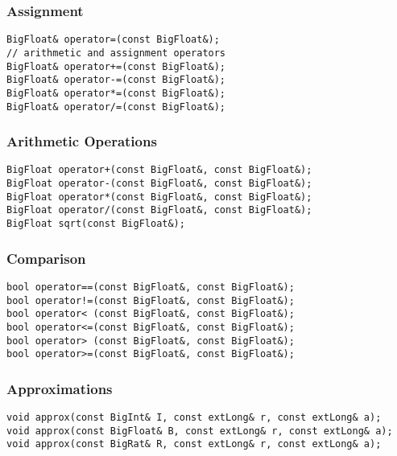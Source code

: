 \subsubsection{Assignment}

\begin{progb} {
\> \tt	BigFloat\& operator=(const BigFloat\&);\\
\> // arithmetic and assignment operators\\
\> \tt	BigFloat\& operator+=(const BigFloat\&);\\
\> \tt	BigFloat\& operator-=(const BigFloat\&);\\
\> \tt	BigFloat\& operator*=(const BigFloat\&);\\
\> \tt	BigFloat\& operator/=(const BigFloat\&);
}\end{progb}

\subsubsection{Arithmetic Operations}
\begin{progb} {
\> \tt	BigFloat operator+(const BigFloat\&, const BigFloat\&); \\
\> \tt	BigFloat operator-(const BigFloat\&, const BigFloat\&); \\
\> \tt	BigFloat operator*(const BigFloat\&, const BigFloat\&); \\
\> \tt	BigFloat operator/(const BigFloat\&, const BigFloat\&); \\
\> \tt	BigFloat sqrt(const BigFloat\&);
}\end{progb}

\subsubsection{Comparison}
\begin{progb} {
\> \tt	bool operator==(const BigFloat\&, const BigFloat\&); \\
\> \tt	bool operator!=(const BigFloat\&, const BigFloat\&); \\
\> \tt	bool operator< (const BigFloat\&, const BigFloat\&); \\
\> \tt	bool operator<=(const BigFloat\&, const BigFloat\&); \\
\> \tt	bool operator> (const BigFloat\&, const BigFloat\&); \\
\> \tt	bool operator>=(const BigFloat\&, const BigFloat\&);
}\end{progb}

\subsubsection{Approximations}
\label{sec-bf-approx}
\begin{progb} {
\> \tt  void approx(const BigInt\& I, const extLong\& r, const extLong\& a);\\
\> \tt  void approx(const BigFloat\& B, const extLong\& r, const extLong\& a);\\
\> \tt  void approx(const BigRat\& R, const extLong\& r, const extLong\& a);
}\end{progb}

